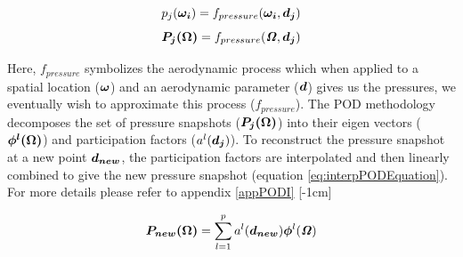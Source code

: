 \begin{equation} \label{eq:pijSnapshot}
p_{j}(\boldsymbol{\omega_{i}}) = f_{pressure}(\boldsymbol{\omega_{i}}, \boldsymbol{d_{j}})
\end{equation} 
\begin{equation}\label{eq:pressurefield}
\boldsymbol{P_{j}(\Omega)} = f_{pressure}(\bm{\mathit{\Omega}}, \boldsymbol{d_{j}})
\end{equation} 

Here, $f_{pressure}$ symbolizes the aerodynamic process which when applied to a spatial location ($\boldsymbol{\omega}$) and an aerodynamic parameter ($\boldsymbol{d}$) gives us the pressures, we eventually wish to approximate this process ($f_{pressure}$). The POD methodology decomposes the set of pressure snapshots ($\boldsymbol{P_{j}(\Omega)}$) into their eigen vectors ($\boldsymbol{\phi^{l}(\Omega)}$) and participation factors ($a^{l}(\boldsymbol{d_{j}})$). To reconstruct the pressure snapshot at a new point $\boldsymbol{d_{new}}$, the participation factors are interpolated and then linearly combined to give the new pressure snapshot (equation \ref{eq:interpPODEquation}). For more details please refer to appendix \ref{appPODI}
[-1cm]

\begin{equation}\label{eq:interpPODEquation}
\boldsymbol{P_{new}(\Omega)} = \sum_{l=1}^{p}a^{l}(\boldsymbol{d_{new}}) \boldsymbol{\phi}^l(\bm{\mathit{\Omega}})
\end{equation}

